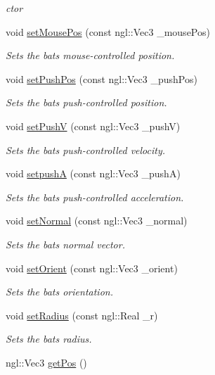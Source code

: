\begin{DoxyCompactItemize}
\begin{DoxyCompactList}\small\item\em ctor \end{DoxyCompactList}\item 
void \hyperlink{class_bat_a243a43c23e389b55cb85167fdf657ceb}{set\+Mouse\+Pos} (const ngl\+::\+Vec3 \+\_\+mouse\+Pos)
\begin{DoxyCompactList}\small\item\em Sets the bat\textquotesingle{}s mouse-\/controlled position. \end{DoxyCompactList}\item 
void \hyperlink{class_bat_a17b4c6b2b70a2800a952e16022f47820}{set\+Push\+Pos} (const ngl\+::\+Vec3 \+\_\+push\+Pos)
\begin{DoxyCompactList}\small\item\em Sets the bat\textquotesingle{}s push-\/controlled position. \end{DoxyCompactList}\item 
void \hyperlink{class_bat_a7e7c34ffd00a351cbfbc0c4389bfa43e}{set\+Push\+V} (const ngl\+::\+Vec3 \+\_\+push\+V)
\begin{DoxyCompactList}\small\item\em Sets the bat\textquotesingle{}s push-\/controlled velocity. \end{DoxyCompactList}\item 
void \hyperlink{class_bat_a00e563db4fad9c3a90eb72b5e5e68bc9}{setpush\+A} (const ngl\+::\+Vec3 \+\_\+push\+A)
\begin{DoxyCompactList}\small\item\em Sets the bat\textquotesingle{}s push-\/controlled acceleration. \end{DoxyCompactList}\item 
void \hyperlink{class_bat_a701c00889957e06bd4e78f8e5bc2ec85}{set\+Normal} (const ngl\+::\+Vec3 \+\_\+normal)
\begin{DoxyCompactList}\small\item\em Sets the bat\textquotesingle{}s normal vector. \end{DoxyCompactList}\item 
void \hyperlink{class_bat_acfdb8dcdc698f12a950911f4f7c21995}{set\+Orient} (const ngl\+::\+Vec3 \+\_\+orient)
\begin{DoxyCompactList}\small\item\em Sets the bat\textquotesingle{}s orientation. \end{DoxyCompactList}\item 
void \hyperlink{class_bat_ac7afffdf395f73c1ac05092a81fa863e}{set\+Radius} (const ngl\+::\+Real \+\_\+r)
\begin{DoxyCompactList}\small\item\em Sets the bat\textquotesingle{}s radius. \end{DoxyCompactList}\item 
\hypertarget{class_bat_a7df35992554d7beddebfc3d1a2284891}{}ngl\+::\+Vec3 \hyperlink{class_bat_a7df35992554d7beddebfc3d1a2284891}{get\+Pos} ()\label{class_bat_a7df35992554d7beddebfc3d1a2284891}


\end{DoxyCompactItemize}
